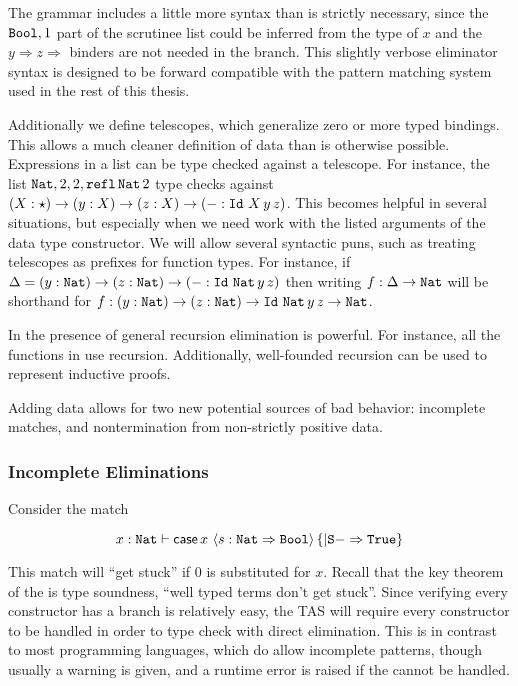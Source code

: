 The grammar includes a little more syntax than is strictly necessary, since the $\mathtt{Bool}{},1$ part of the scrutinee list could be inferred from the type of $x$ and the $y\Rightarrow z\Rightarrow$ binders are not needed in the branch.
This slightly verbose \case{} eliminator syntax is designed to be forward compatible with the pattern matching system used in the rest of this thesis. 

Additionally we define telescopes, which generalize zero or more typed bindings.
This allows a much cleaner definition of data than is otherwise possible.
Expressions in a list can be type checked against a telescope. %
For instance, the list $\mathtt{Nat}{},2,2,\mathtt{refl}\,\mathtt{Nat}{}\,2$ type checks against $\left(X:\star\right)\rightarrow\left(y:X\right)\rightarrow\left(z:X\right)\rightarrow\left(-:\Id{}\ X\,y\,z\right)$.
This becomes helpful in several situations, but especially when we need work with the listed arguments of the data type constructor.
We will allow several syntactic puns, such as treating telescopes as prefixes for function types.
For instance, 
  if $\Delta=\left(y:\mathtt{Nat}{} \right)\rightarrow\left(z:\mathtt{Nat}{} \right)\rightarrow\left(-:\mathtt{Id}{}\ \mathtt{Nat}{} \,y\,z\right)$
  then writing $f:\Delta\rightarrow\mathtt{Nat}{} $
  will be shorthand for $f:\left(y:\mathtt{Nat}{} \right)\rightarrow\left(z:\mathtt{Nat}{} \right)\rightarrow \mathtt{Id}{}\ \mathtt{Nat}{} \,y\,z\rightarrow\mathtt{Nat}{}$.

In the presence of general recursion \case{} elimination is powerful.
For instance, all the functions in  use recursion.
Additionally, well-founded recursion can be used to represent inductive proofs.

Adding data allows for two new potential sources of bad behavior: incomplete matches, and nontermination from non-strictly positive data. 

\subsubsection{Incomplete Eliminations}

Consider the match 

\[
x:\mathtt{Nat}{}\vdash\mathsf{case}{}\,x\,\left\langle s:\mathtt{Nat}{}\Rightarrow\mathtt{Bool}{}\right\rangle \left\{ |\mathtt{S}{}-\Rightarrow \mathtt{True}{}\right\} 
\]

This match will ``get stuck'' if $0$ is substituted for $x$.
Recall that the key theorem of the \slang{} is type soundness, ``well typed terms don't get stuck''.
Since verifying every constructor has a branch is relatively easy, the \slang{} \ac{TAS} will require every constructor to be handled in order to type check with direct elimination.
This is in contrast to most programming languages, which do allow incomplete patterns, though usually a warning is given, and a runtime error is raised if the \scrut{} cannot be handled.

